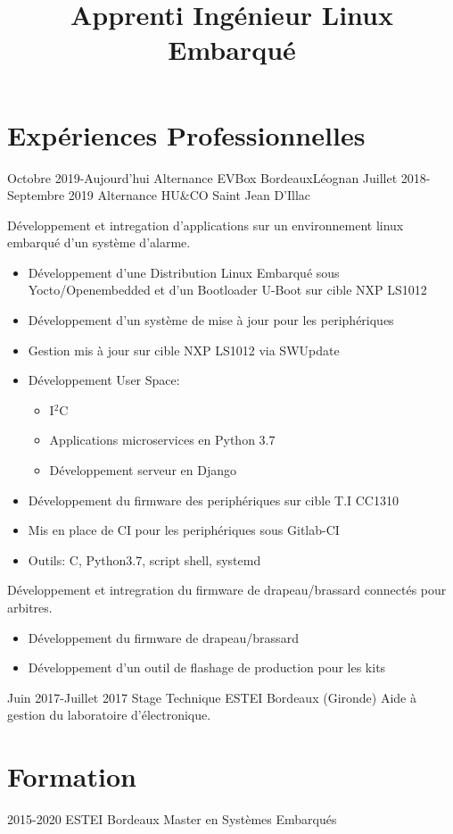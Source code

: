 \documentclass[9pts,a4paper,sans]{moderncv}
\title{Apprenti Ingénieur Linux Embarqué }
\begin{document}
\maketitle

\section{Expériences Professionnelles}
\cventry{} {Octobre 2019-Aujourd'hui} {Alternance} {EVBox Bordeaux}{Léognan}{}
\cventry{} {Juillet 2018-Septembre 2019} {Alternance} {HU\&CO} {Saint Jean D'Illac} {
	Développement et intregation d'applications sur un environnement linux embarqué d'un système d'alarme.
	\begin{itemize}
		\item Développement d'une Distribution Linux Embarqué sous Yocto/Openembedded et d'un Bootloader U-Boot sur cible NXP LS1012
		\item Développement d'un système de mise à jour pour les periphériques
		\item Gestion mis à jour sur cible NXP LS1012 via SWUpdate 
		\item Développement User Space:
		\begin{itemize}
			\item I$^{2}$C
			\item Applications microservices en Python 3.7
			\item Développement serveur en Django
		\end{itemize}
		\item Développement du firmware des periphériques sur cible T.I CC1310
		\item Mis en place de CI pour les periphériques sous Gitlab-CI 
		\item Outils: C, Python3.7, script shell, systemd 
	\end{itemize}
	Développement et intregration du firmware de drapeau/brassard connectés pour arbitres.
	\begin{itemize}
		\item Développement du firmware de drapeau/brassard
		\item Développement d'un outil de flashage de production pour les kits
	\end{itemize}
}

\cventry{} {Juin 2017-Juillet 2017} {Stage Technique} {ESTEI} {Bordeaux (Gironde)} {Aide à gestion du laboratoire d’électronique.} {}
{} {}

\section{Formation}
\cventry{} {2015-2020} {ESTEI} {Bordeaux} {Master en Systèmes Embarqués} {}
\end{document}
